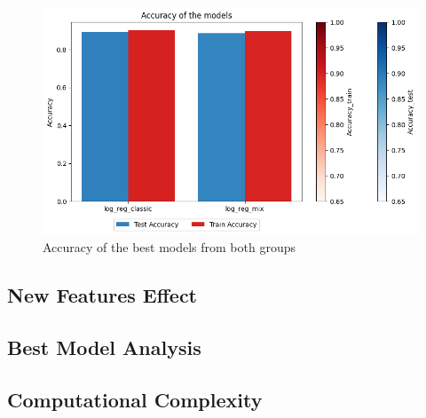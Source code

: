 	\begin{figure}[H]
		\centering
		\includegraphics[width=\columnwidth]{images/acc_best_models.png}
		\caption{Accuracy of the best models from both groups}
		\label{fig:acc_best_models}
	\end{figure}
	




\subsection{New Features Effect}




\subsection{Best Model Analysis}



\subsection{Computational Complexity}



